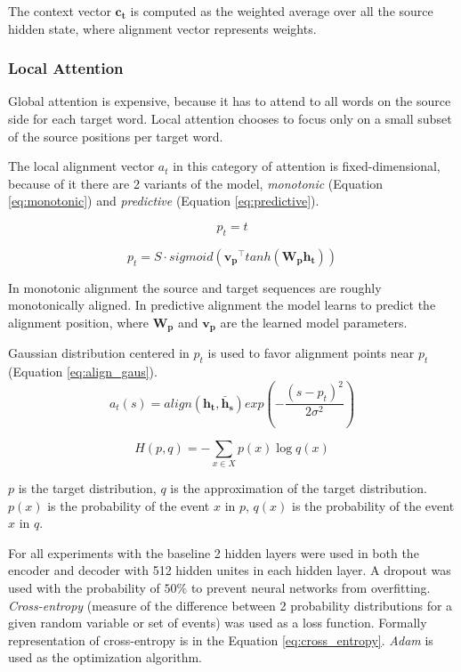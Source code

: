 The context vector $\mathbf{c_t}$ is computed as the weighted average over all the source hidden state, where alignment vector represents weights.

\subsubsection{Local Attention}
Global attention is expensive, because it has to attend to all words on the source side for each target word. Local attention chooses to focus only on a small subset of the source positions per target word.

The local alignment vector $a_t$ in this category of attention is fixed-dimensional, because of it there are 2 variants of the model, \textit{monotonic} (Equation \ref{eq:monotonic}) and \textit{predictive} (Equation \ref{eq:predictive}).

\begin{equation} \label{eq:monotonic}
p_t = t
\end{equation}

\begin{equation} \label{eq:predictive}
p_t = S \cdot sigmoid(\mathbf{v_p}^\intercal tanh(\mathbf{W_p} \mathbf{h_t}))
\end{equation}

In monotonic alignment the source and target sequences are roughly monotonically aligned. In predictive alignment the model learns to predict the alignment position, where $\mathbf{W_p}$ and $\mathbf{v_p}$ are the learned model parameters.

Gaussian distribution centered in $p_t$ is used to favor alignment points near $p_t$ (Equation \ref{eq:align_gaus}).
\begin{equation} \label{eq:align_gaus}
a_t(s) = align(\mathbf{h_t}, \mathbf{\bar{h}_s}) exp(-\frac{(s-p_t)^2}{2\sigma^2})
\end{equation}

\begin{eqfloat}
\begin{equation} \label{eq:cross_entropy}
H(p,q) = -\sum_{x \in X} p(x)\log q(x)
\end{equation}
\caption{$p$ is the target distribution, $q$ is the approximation of the target distribution. $p(x)$ is the probability of the event $x$ in $p$, $q(x)$ is the probability of the event $x$ in $q$.}
\end{eqfloat}

For all experiments with the baseline 2 hidden layers were used in both the encoder and decoder with 512 hidden unites in each hidden layer. A dropout \cite{srivastava2014dropout} was used with the probability of $50\%$ to prevent neural networks from overfitting. \textit{Cross-entropy} (measure of the difference between 2 probability distributions for a given random variable or set of events) was used as a loss function. Formally representation of cross-entropy is in the Equation \ref{eq:cross_entropy}. \textit{Adam} \cite{kingma2014adam} is used as the optimization algorithm.

